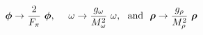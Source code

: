 \begin{equation}
\mbox{\boldmath$\phi$} \rightarrow \frac{2}{F_\pi}~\mbox{\boldmath$\phi $} ,~~~~\omega \rightarrow \frac{g_\omega}{M_\omega^2}~\omega,~~{\rm and}~~ \mbox{\boldmath$\rho$} \rightarrow \frac{g_\rho}{M_\rho^2}~ \mbox{\boldmath$\rho$}  \label{eq:v2}
\end{equation}

